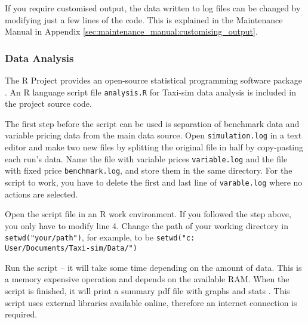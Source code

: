 If you require customised output, the data written to log files can be changed
by modifying just a few lines of the code. This is explained in the Maintenance
Manual in Appendix \ref{sec:maintenance_manual:customising_output}.


\subsubsection{Data Analysis}
\label{sec:user_manual:using:data}


The R Project provides an open-source statistical programming software package
\parencite{Rlang}. An R language script file \texttt{analysis.R} for Taxi-sim
data analysis is included in the project source code. 

The first step before the script can be used is separation of benchmark data
and variable pricing data from the main data source. Open
\texttt{simulation.log} in a text editor and make two new files by splitting
the original file in half by copy-pasting each run's data. Name the file with
variable prices \texttt{variable.log} and the file with fixed price
\texttt{benchmark.log}, and store them in the same directory. For the script to
work, you have to delete the first and last line of \texttt{varable.log} where
no actions are selected.

Open the script file in an R work environment. If you followed the step above,
you only have to modify line 4. Change the path of your working directory in
\texttt{setwd("your/path")}, for example, to be
\texttt{setwd("c:\\User/Documents/Taxi-sim/Data/")} 

Run the script -- it will take some time depending on the amount of data. This
is a memory expensive operation and depends on the available RAM. When the
script is finished, it will print a summary pdf file with graphs and stats
. This script uses external libraries available online,
therefore an internet connection is required.
